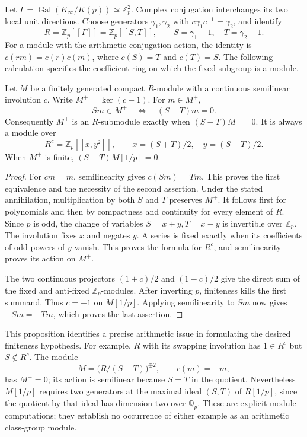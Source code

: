 Let \(\Gamma=\operatorname{Gal}(K_\infty/K(p))\simeq\mathbb Z_p^2\).
Complex conjugation interchanges its two local unit directions.
Choose generators \(\gamma_1,\gamma_2\) with
\(c\gamma_1c^{-1}=\gamma_2\), and identify
\[
 R=\mathbb Z_p[[\Gamma]]
   =\mathbb Z_p[[S,T]],\qquad S=\gamma_1-1,\quad T=\gamma_2-1 .
\]
For a module with the arithmetic conjugation action, the identity
is \(c(rm)=c(r)c(m)\), where \(c(S)=T\) and \(c(T)=S\).
The following calculation specifies the coefficient ring on which
the fixed subgroup is a module.

\begin{proposition}\label{prop:cm-plus}
Let \(M\) be a finitely generated compact \(R\)-module with a
continuous semilinear involution \(c\). Write \(M^+=\ker(c-1)\).
For \(m\in M^+\),
\[
 Sm\in M^+\quad\Longleftrightarrow\quad(S-T)m=0 .
\]
Consequently \(M^+\) is an \(R\)-submodule exactly when
\((S-T)M^+=0\). It is always a module over
\[
 R^c=\mathbb Z_p[[x,y^2]],\qquad
 x=(S+T)/2,\quad y=(S-T)/2 .
\]
When \(M^+\) is finite, \((S-T)M[1/p]=0\).
\end{proposition}
\begin{proof}
For \(cm=m\), semilinearity gives \(c(Sm)=Tm\). This proves
the first equivalence and the necessity of the second assertion.
Under the stated annihilation, multiplication by both \(S\) and
\(T\) preserves \(M^+\). It follows first for polynomials and then
by compactness and continuity for every element of \(R\).
Since \(p\) is odd, the change of variables \(S=x+y,T=x-y\) is
invertible over \(\mathbb Z_p\). The involution fixes \(x\) and
negates \(y\). A series is fixed exactly when its coefficients of
odd powers of \(y\) vanish. This proves the formula for \(R^c\),
and semilinearity proves its action on \(M^+\).

The two continuous projectors \((1+c)/2\) and \((1-c)/2\) give
the direct sum of the fixed and anti-fixed \(\mathbb Z_p\)-modules.
After inverting \(p\), finiteness kills the first summand.
Thus \(c=-1\) on \(M[1/p]\). Applying semilinearity to \(Sm\)
now gives \(-Sm=-Tm\), which proves the last assertion.
\end{proof}

This proposition identifies a precise arithmetic issue in formulating
the desired finiteness hypothesis. For example, \(R\) with its swapping
involution has \(1\in R^c\) but \(S\notin R^c\).
The module
\[
 M=\bigl(R/(S-T)\bigr)^{\oplus2},\qquad c(m)=-m,
\]
has \(M^+=0\); its action is semilinear because \(S=T\) in the
quotient. Nevertheless \(M[1/p]\) requires two generators at
the maximal ideal \((S,T)\) of \(R[1/p]\), since the quotient by
that ideal has dimension two over \(\mathbb Q_p\).
These are explicit module computations; they establish no occurrence
of either example as an arithmetic class-group module.

